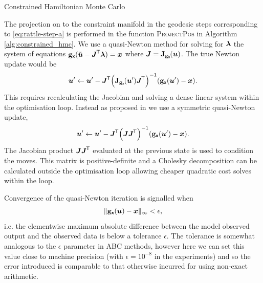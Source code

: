 \begin{algorithm}[!t]
\caption{Constrained Hamiltonian Monte Carlo}
\label{alg:constrained_hmc}
{
\small

}
\end{algorithm}

The projection on to the constraint manifold in the geodesic steps corresponding to \eqref{eq:rattle-step-a} is performed in the function \textsc{ProjectPos} in Algorithm \ref{alg:constrained_hmc}. We use a quasi-Newton method for solving for $\boldsymbol{\lambda}$ the system of equations ${\mathbf{g}}_{\boldsymbol{\mathsf{x}}}(\tilde{\boldsymbol{u}} - \boldsymbol{J}^{\mkern-1.5mu\mathsf{T}}\boldsymbol{\lambda}) = \boldsymbol{x}$ where $\mtx{J} = \jacob{\genfunc_{\rvct{x}}}{\vct{u}}$. The true Newton update would be
\begin{equation}\label{eq:newton-iteration}
    \vct{u}'\gets \vct{u}' - 
    \mtx{J}\tr
    \lpa 
        \jacob{\genfunc_{\rvct{x}}}{\vct{u}'}\mtx{J}\tr
    \rpa^{-1}
    \lpa \genfunc_{\rvct{x}}(\vct{u}') - \vct{x} \rpa.
\end{equation}
This requires recalculating the Jacobian and solving a dense linear system within the optimisation loop. Instead as proposed in \citep{barth1995algorithms} we use a symmetric quasi-Newton update, 
\begin{equation}\label{eq:quasi-newton-iteration}
    \vct{u}'\gets \vct{u}' - 
    \mtx{J}\tr
    \lpa 
        \mtx{J}\mtx{J}\tr
    \rpa^{-1}
    \lpa \genfunc_{\rvct{x}}(\vct{u}') - \vct{x} \rpa.
\end{equation}
The Jacobian product $\boldsymbol{J}\boldsymbol{J}^{\mkern-1.5mu\mathsf{T}}$ evaluated at the previous state is used to condition the moves. This matrix is positive-definite and a Cholesky decomposition can be calculated outside the optimisation loop allowing cheaper quadratic cost solves within the loop. 

Convergence of the quasi-Newton iteration is signalled when
\begin{equation}
  \Vert {\mathbf{g}}_{\boldsymbol{\mathsf{x}}}(\boldsymbol{u}) - \boldsymbol{x}\Vert_\infty < \epsilon, 
\end{equation}  
i.e. the elementwise maximum absolute difference between the model observed output and the observed data is below a tolerance $\epsilon$. The tolerance is somewhat analogous to the $\epsilon$ parameter in \ac{ABC} methods, however here we can set this value close to machine precision (with $\epsilon = 10^{-8}$ in the experiments) and so the error introduced is comparable to that otherwise incurred for using non-exact arithmetic.

